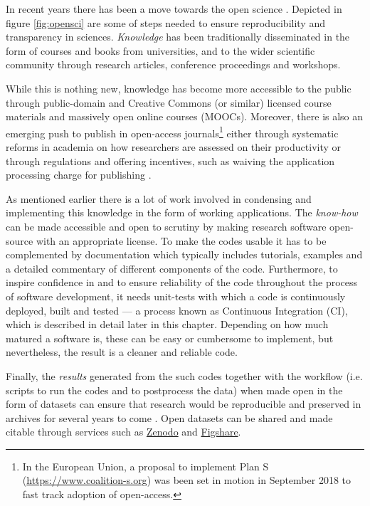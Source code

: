 In recent years there has been a move towards the open science
\citep[see the report by][]{royal_society_great_britain_science_2012}.
%
Depicted in figure \ref{fig:opensci} are some of steps needed to ensure
reproducibility and transparency in sciences.
%
\emph{Knowledge} has been traditionally disseminated in the form of courses and
books from universities, and to the wider scientific community through research
articles, conference proceedings and workshops.

While this is nothing new, knowledge has become more accessible to the public
through public-domain and Creative Commons (or similar) licensed course
materials and massively open online courses (MOOCs). Moreover, there is also an
emerging push to publish in open-access journals\footnote{In the European
  Union, a proposal to implement Plan S (\url{https://www.coalition-s.org}) was
  been set in motion in September 2018 to fast track adoption of open-access.
} either through systematic
reforms in academia on how researchers are assessed on their productivity or
through regulations and offering incentives, such as waiving the application
processing charge for publishing \citep{nosek_promoting_2015}.

As mentioned earlier there is a lot of work involved in condensing and
implementing this knowledge in the form of working applications.
%
The \emph{know-how} can be made accessible and open to scrutiny by making
research software open-source with an appropriate license.  To make the codes
usable it has to be complemented by documentation which typically includes
tutorials, examples and a detailed commentary of different components of the code.
%
Furthermore, to inspire confidence in and to ensure reliability of the code
throughout the process of software development, it needs unit-tests with
which a code is continuously deployed, built and tested --- a process known as
Continuous Integration (CI), which is described in detail later in this
chapter. Depending on how much matured a software is, these can be easy or
cumbersome to implement, but nevertheless, the result is a cleaner and reliable
code.

Finally, the \emph{results} generated from the such codes together with the
workflow (i.e. scripts to run the codes and to postprocess the data) when made
open in the form of datasets can ensure that research would be reproducible and
preserved in archives for several years to come \citep{gewin_data_2016}. Open
datasets can be shared and made citable through services such as
\href{https://zenodo.org}{Zenodo} and \href{https://figshare.com}{Figshare}.

